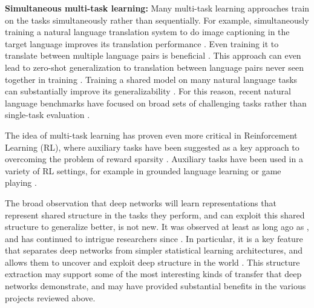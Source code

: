 \textbf{Simultaneous multi-task learning:} Many multi-task learning approaches train on the tasks simultaneously rather than sequentially. For example, simultaneously training a natural language translation system to do image captioning in the target language improves its translation performance \citep{Luong2016}. Even training it to translate between multiple language pairs is beneficial \citep{Dong2015}. This approach can even lead to zero-shot generalization to translation between language pairs never seen together in training \citep{Johnson2016a, Platanios2017}. Training a shared model on many natural language tasks can substantially improve its generalizability \citep{Raffel2019}. For this reason, recent natural language benchmarks have focused on broad sets of challenging tasks rather than single-task evaluation \citep{Wang2019,Wang2019b}.\par 
The idea of multi-task learning has proven even more critical in Reinforcement Learning (RL), where auxiliary tasks have been suggested as a key approach to overcoming the problem of reward sparsity \citep[e.g.][]{LeCun2016}. Auxiliary tasks have been used in a variety of RL settings, for example in grounded language learning \citep{Hermann2017} or game playing \citep{OpenAI2019, Vinyals2019}. \par
The broad observation that deep networks will learn representations that represent shared structure in the tasks they perform, and can exploit this shared structure to generalize better, is not new. It was observed at least as long ago as \citet{Hinton1986}, and has continued to intrigue researchers since \citep[e.g.][]{Lampinen2017a}. In particular, it is a key feature that separates deep networks from simpler statistical learning architectures, and allows them to uncover and exploit deep structure in the world \citep{Rogers2008}. This structure extraction may support some of the most interesting kinds of transfer that deep networks demonstrate, and may have provided substantial benefits in the various projects reviewed above. \par 

